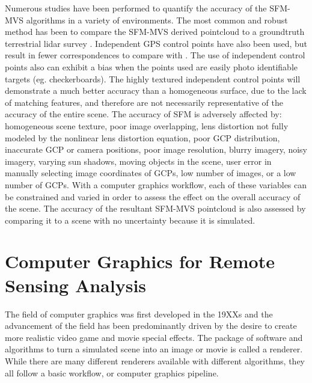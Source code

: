 Numerous studies have been performed to quantify the accuracy of the SFM-MVS algorithms in a variety of environments.  The most common and robust method has been to compare the SFM-MVS derived pointcloud to a groundtruth terrestrial lidar survey .  Independent GPS control points have also been used, but result in fewer correspondences to compare with .  The use of independent control points also can exhibit a bias when the points used are easily photo identifiable targets (eg. checkerboards).  The highly textured independent control points will demonstrate a much better accuracy than a homogeneous surface, due to the lack of matching features, and therefore are not necessarily representative of the accuracy of the entire scene.  The accuracy of SFM is adversely affected by: homogeneous scene texture, poor image overlapping, lens distortion not fully modeled by the nonlinear lens distortion equation, poor GCP distribution, inaccurate GCP or camera positions, poor image resolution, blurry imagery, noisy imagery, varying sun shadows, moving objects in the scene, user error in manually selecting image coordinates of GCPs, low number of images, or a low number of GCPs.  With a computer graphics workflow, each of these variables can be constrained and varied in order to assess the effect on the overall accuracy of the scene.  The accuracy of the resultant SFM-MVS pointcloud is also assessed by comparing it to a scene with no uncertainty because it is simulated.  

\section{Computer Graphics for Remote Sensing Analysis}

The field of computer graphics was first developed in the 19XXs and the advancement of the field has been predominantly driven by the desire to create more realistic video game and movie special effects.   The package of software and algorithms to turn a simulated scene into an image or movie is called a renderer.  While there are many different renderers available with different algorithms, they all follow a basic workflow, or computer graphics pipeline.  

